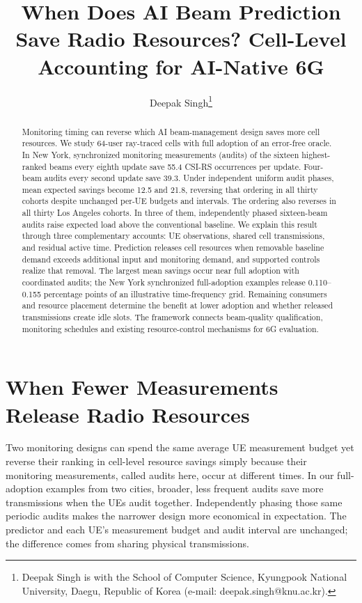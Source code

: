 \documentclass[journal,10pt]{IEEEtran}
\title{When Does AI Beam Prediction Save Radio Resources? Cell-Level Accounting for AI-Native 6G}
\author{Deepak Singh\thanks{Deepak Singh is with the School of Computer Science, Kyungpook National University, Daegu, Republic of Korea (e-mail: deepak.singh@knu.ac.kr).}}
\begin{document}
\maketitle
\begin{abstract}
Monitoring timing can reverse which AI beam-management design saves more cell resources. We study 64-user ray-traced cells with full adoption of an error-free oracle. In New York, synchronized monitoring measurements (audits) of the sixteen highest-ranked beams every eighth update save 55.4 CSI-RS occurrences per update. Four-beam audits every second update save 39.3. Under independent uniform audit phases, mean expected savings become 12.5 and 21.8, reversing that ordering in all thirty cohorts despite unchanged per-UE budgets and intervals. The ordering also reverses in all thirty Los Angeles cohorts. In three of them, independently phased sixteen-beam audits raise expected load above the conventional baseline. We explain this result through three complementary accounts: UE observations, shared cell transmissions, and residual active time. Prediction releases cell resources when removable baseline demand exceeds additional input and monitoring demand, and supported controls realize that removal. The largest mean savings occur near full adoption with coordinated audits; the New York synchronized full-adoption examples release 0.110--0.155 percentage points of an illustrative time-frequency grid. Remaining consumers and resource placement determine the benefit at lower adoption and whether released transmissions create idle slots. The framework connects beam-quality qualification, monitoring schedules and existing resource-control mechanisms for 6G evaluation.
\end{abstract}

\section{When Fewer Measurements Release Radio Resources}
Two monitoring designs can spend the same average UE measurement budget yet reverse their ranking in cell-level resource savings simply because their monitoring measurements, called audits here, occur at different times. In our full-adoption examples from two cities, broader, less frequent audits save more transmissions when the UEs audit together. Independently phasing those same periodic audits makes the narrower design more economical in expectation. The predictor and each UE's measurement budget and audit interval are unchanged; the difference comes from sharing physical transmissions.
\end{document}
